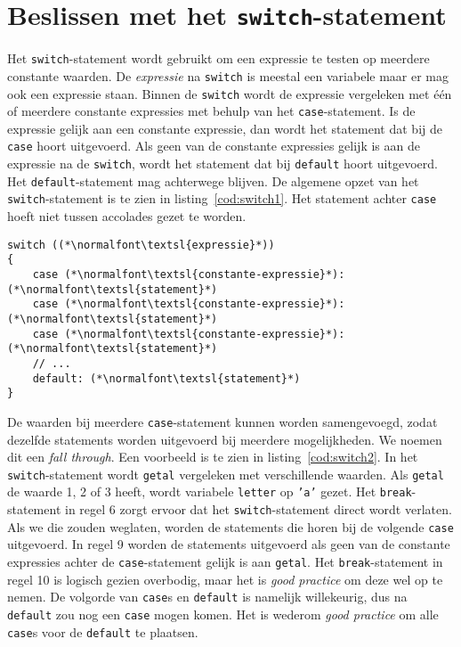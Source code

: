 \section{Beslissen met het \texttt{switch}-statement}
Het \texttt{switch}-statement wordt gebruikt om een expressie te testen op meerdere constante waarden. De \textsl{expressie} na \texttt{switch} is meestal een variabele maar er mag ook een expressie staan. Binnen de \texttt{switch} wordt de expressie vergeleken met één of meerdere constante expressies met behulp van het \texttt{case}-statement. Is de expressie gelijk aan een constante expressie, dan wordt het statement dat bij de \texttt{case} hoort uitgevoerd. Als geen van de constante expressies gelijk is aan de expressie na de \texttt{switch}, wordt het statement dat bij \texttt{default} hoort uitgevoerd. Het \texttt{default}-statement mag achterwege blijven. De algemene opzet van het \texttt{switch}-statement is te zien in listing~\ref{cod:switch1}. Het statement achter \texttt{case} hoeft niet tussen accolades gezet te worden.

\begin{lstlisting}[caption=Opzet van het \texttt{switch}-statment.,label=cod:switch1]
switch ((*\normalfont\textsl{expressie}*))
{
    case (*\normalfont\textsl{constante-expressie}*): (*\normalfont\textsl{statement}*)
    case (*\normalfont\textsl{constante-expressie}*): (*\normalfont\textsl{statement}*)
    case (*\normalfont\textsl{constante-expressie}*): (*\normalfont\textsl{statement}*)
    // ...
    default: (*\normalfont\textsl{statement}*)
}
\end{lstlisting}

De waarden bij meerdere \texttt{case}-statement kunnen worden samengevoegd, zodat dezelfde statements worden uitgevoerd bij meerdere mogelijkheden. We noemen dit een \textsl{fall through}. Een voorbeeld is te zien in listing~\ref{cod:switch2}. In het \texttt{switch}-statement wordt \texttt{getal} vergeleken met verschillende waarden. Als \texttt{getal} de waarde 1, 2  of 3 heeft, wordt variabele \texttt{letter} op \texttt{'a'} gezet. Het \texttt{break}-statement in regel 6 zorgt ervoor dat het \texttt{switch}-statement direct wordt verlaten. Als we die zouden weglaten, worden de statements die horen bij de volgende \texttt{case} uitgevoerd. In regel 9 worden de statements uitgevoerd als geen van de constante expressies achter de \texttt{case}-statement gelijk is aan \texttt{getal}. Het \texttt{break}-statement in regel 10 is logisch gezien overbodig, maar het is \textsl{good practice} om deze wel op te nemen. De volgorde van \texttt{case}s en \texttt{default} is namelijk willekeurig, dus na \texttt{default} zou nog een \texttt{case} mogen komen. Het is wederom \textsl{good practice} om alle \texttt{case}s voor de \texttt{default} te plaatsen.

